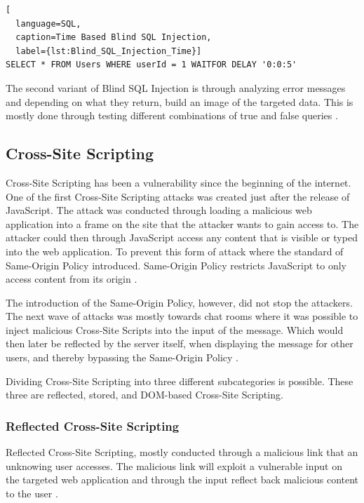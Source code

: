 \hfill
\begin{lstlisting}[
  language=SQL,
  caption=Time Based Blind SQL Injection,
  label={lst:Blind_SQL_Injection_Time}]
SELECT * FROM Users WHERE userId = 1 WAITFOR DELAY '0:0:5'
\end{lstlisting}
\hfill

The second variant of Blind SQL Injection is through analyzing error messages and depending on what they return, build an image of the targeted data. This is mostly done through testing different combinations of true and false queries \parencite{JustinClarke-Salt2009SIAa, Secure_Web}.



\subsection{Cross-Site Scripting}
Cross-Site Scripting has been a vulnerability since the beginning of the internet. One of the first Cross-Site Scripting attacks was created just after the release of JavaScript. The attack was conducted through loading a malicious web application into a frame on the site that the attacker wants to gain access to. The attacker could then through JavaScript access any content that is visible or typed into the web application. To prevent this form of attack where the standard of Same-Origin Policy introduced. Same-Origin Policy restricts JavaScript to only access content from its origin \parencite{FogieSeth2007Xacs, w3csop}.

The introduction of the Same-Origin Policy, however, did not stop the attackers. The next wave of attacks was mostly towards chat rooms where it was possible to inject malicious Cross-Site Scripts into the input of the message. Which would then later be reflected by the server itself, when displaying the message for other users, and thereby bypassing the Same-Origin Policy \parencite{FogieSeth2007Xacs}.

Dividing Cross-Site Scripting into three different subcategories is possible. These three are reflected, stored, and DOM-based Cross-Site Scripting.



\subsubsection{Reflected Cross-Site Scripting}
Reflected Cross-Site Scripting, mostly conducted through a malicious link that an unknowing user accesses. The malicious link will exploit a vulnerable input on the targeted web application and through the input reflect back malicious content to the user \parencite{Secure_Web}.



